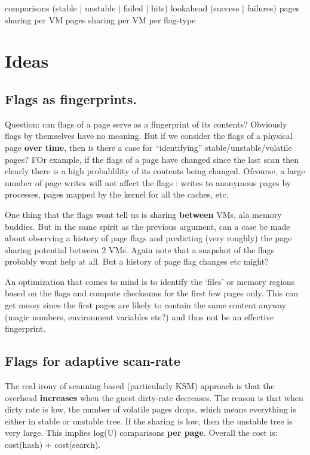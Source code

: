 \documentclass[11pt]{article}
\begin{document}
comparisons (stable | unstable | failed | hits)
lookahead (success | failures)
pages sharing per VM
pages sharing per VM per flag-type
\section{Ideas}
\label{sec-11}
\subsection{Flags as fingerprints.}
\label{sec-11_1}

Question: can flags of a page serve as a fingerprint of its contents? Obviously flags by themselves have no meaning. But if we consider the flags of a physical page \textbf{over time}, then is there a case for ``identifying'' stable/unstable/volatile pages? FOr example, if the flags of a page have changed since the last scan then clearly there is a high probablility of its contents being changed. 
Ofcourse, a large number of page writes will not affect the flags : writes to anonymous pages by processes, pages mapped by the kernel for all the caches, etc.

One thing that the flags wont tell us is sharing \textbf{between} VMs, ala memory buddies. 
But in the same spirit as the previous argument, can a case be made about observing a history of page flags and predicting (very roughly) the page sharing potential between 2 VMs. Again note that a snapshot of the flags probably wont help at all. But a history of page flag changes etc might?

An optimization that comes to mind is to identify the `files' or memory regions based on the flags and compute checksums for the first few pages only. This can get messy since the first pages are likely to contain the same content anyway (magic numbers, environment variables etc?) and thus not be an effective
fingerprint. 
\subsection{Flags for adaptive scan-rate}
\label{sec-11_2}

The real irony of scanning based (particularly KSM) approach is that the overhead \textbf{increases} when the guest dirty-rate decreases. 
The reason is that when dirty rate is low, the number of volatile pages drops, which means everything is either in stable or unstable tree. If the sharing is low, then the unstable tree is very large. This implies log(U) comparisons \textbf{per page}. Overall the cost is:
cost(hash) + cost(search).
\end{document}
